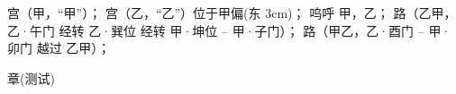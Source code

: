 \usemodule[zhfonts]


宫（甲，“甲”）；
宫（乙，“乙”）位于甲偏(东 3cm)；
呜呼 甲，乙；
路（乙甲，乙·午门 经转 乙·巽位 经转 甲·坤位 -- 甲·子门）；
路（甲乙，乙·酉门 -- 甲·卯门 越过 乙甲）；
\stopuseMPgraphic

\startTEXpage[offset=4pt]
章(测试)
\stopTEXpage
